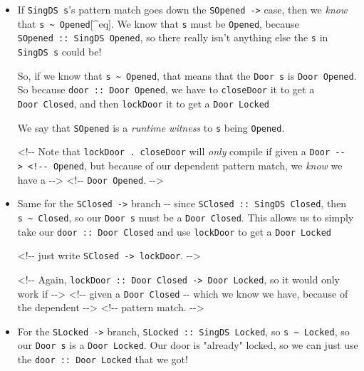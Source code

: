 \documentclass[]{article}
\begin{document}
\begin{itemize}
\item
  If \texttt{SingDS\ s}'s pattern match goes down the
  \texttt{SOpened\ -\textgreater{}} case, then we \emph{know} that
  \texttt{s\ \textasciitilde{}\ \textquotesingle{}Opened}{[}\^{}eq{]}. We know
  that \texttt{s} must be \texttt{\textquotesingle{}Opened}, because
  \texttt{SOpened\ ::\ SingDS\ \textquotesingle{}Opened}, so there really isn't
  anything else the \texttt{s} in \texttt{SingDS\ s} could be!

  So, if we know that \texttt{s\ \textasciitilde{}\ \textquotesingle{}Opened},
  that means that the \texttt{Door\ s} is
  \texttt{Door\ \textquotesingle{}Opened}. So because
  \texttt{door\ ::\ Door\textquotesingle{}\ Opened}, we have to
  \texttt{closeDoor} it to get a \texttt{Door\textquotesingle{}\ Closed}, and
  then \texttt{lockDoor} it to get a \texttt{Door\ \textquotesingle{}Locked}

  We say that \texttt{SOpened} is a \emph{runtime witness} to \texttt{s} being
  \texttt{\textquotesingle{}Opened}.

  \textless{}!-\/- Note that \texttt{lockDoor\ .\ closeDoor} will \emph{only}
  compile if given a
  \texttt{Door\ -\/-\textgreater{}\ \textless{}!-\/-\ \textquotesingle{}Opened},
  but because of our dependent pattern match, we \emph{know} we have a
  -\/-\textgreater{} \textless{}!-\/- \texttt{Door\ \textquotesingle{}Opened}.
  -\/-\textgreater{}
\item
  Same for the \texttt{SClosed\ -\textgreater{}} branch -\/- since
  \texttt{SClosed\ ::\ SingDS\ \textquotesingle{}Closed}, then
  \texttt{s\ \textasciitilde{}\ \textquotesingle{}Closed}, so our
  \texttt{Door\ s} must be a \texttt{Door\ \textquotesingle{}Closed}. This
  allows us to simply take our \texttt{door\ ::\ Door\ \textquotesingle{}Closed}
  and use \texttt{lockDoor} to get a \texttt{Door\ \textquotesingle{}Locked}

  \textless{}!-\/- just write \texttt{SClosed\ -\textgreater{}\ lockDoor}.
  -\/-\textgreater{}

  \textless{}!-\/- Again,
  \texttt{lockDoor\ ::\ Door\ \textquotesingle{}Closed\ -\textgreater{}\ Door\ \textquotesingle{}Locked},
  so it would only work if -\/-\textgreater{} \textless{}!-\/- given a
  \texttt{Door\ \textquotesingle{}Closed} -\/- which we know we have, because of
  the dependent -\/-\textgreater{} \textless{}!-\/- pattern match.
  -\/-\textgreater{}
\item
  For the \texttt{SLocked\ -\textgreater{}} branch,
  \texttt{SLocked\ ::\ SingDS\ \textquotesingle{}Locked}, so
  \texttt{s\ \textasciitilde{}\ \textquotesingle{}Locked}, so our
  \texttt{Door\ s} is a \texttt{Door\ \textquotesingle{}Locked}. Our door is
  "already" locked, so we can just use the
  \texttt{door\ ::\ Door\ \textquotesingle{}Locked} that we got!


\end{itemize}
\end{document}
